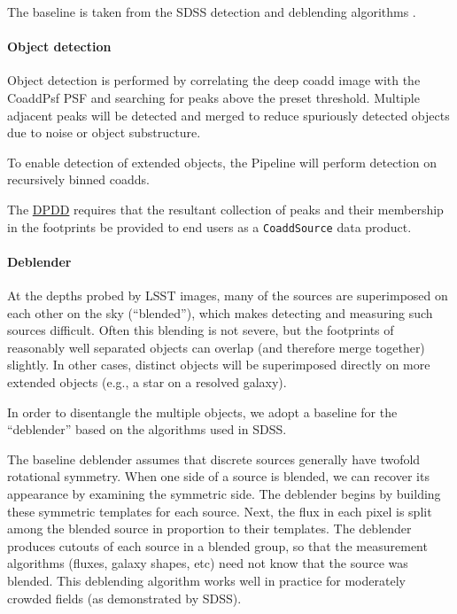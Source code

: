 \documentclass[12pt]{article}
\newcommand{\ds}[2]{{\color{blue} \href{https://docushare.lsstcorp.org/docushare/dsweb/Get/#1}{#2}}\xspace}
\newcommand{\DPDD}{\ds{LSE-163}{DPDD}}
\begin{document}
The baseline is taken from the SDSS detection and deblending algorithms
\cite{Lupton05, LuptonPhoto}.

\paragraph{Object detection}

Object detection is performed by correlating the deep coadd image with the
CoaddPsf PSF and searching for peaks above the preset threshold. Multiple
adjacent peaks will be detected and merged to reduce spuriously detected
objects due to noise or object substructure.

To enable detection of extended objects, the Pipeline will perform detection on
recursively binned coadds.

The \DPDD{} requires that the resultant collection of peaks and their
membership in the footprints be provided to end users as a \texttt{CoaddSource}
data product.

\paragraph{Deblender}
\label{alg:deblender}

At the depths probed by LSST images, many of the sources are superimposed on each other on the sky (``blended''), which makes detecting and measuring such sources difficult.  Often this blending is not severe, but the footprints of reasonably well separated objects can overlap (and therefore merge together) slightly.  In other cases, distinct objects will be superimposed directly on more extended objects (e.g., a star on a resolved galaxy). %

In order to disentangle the multiple objects, we adopt a baseline for the ``deblender'' based on the algorithms used in SDSS.

The baseline deblender assumes that discrete sources generally have twofold
rotational symmetry.  When one side of a source is blended, we can
recover its appearance by examining the symmetric side.  The deblender
begins by building these symmetric templates for each source.  Next,
the flux in each pixel is split among the blended source in proportion
to their templates.  The deblender produces cutouts of each
source in a blended group, so that the measurement algorithms (fluxes,
galaxy shapes, etc) need not know that the source was blended. This deblending algorithm works well in practice for moderately crowded fields (as demonstrated by SDSS).
\\
\end{document}
